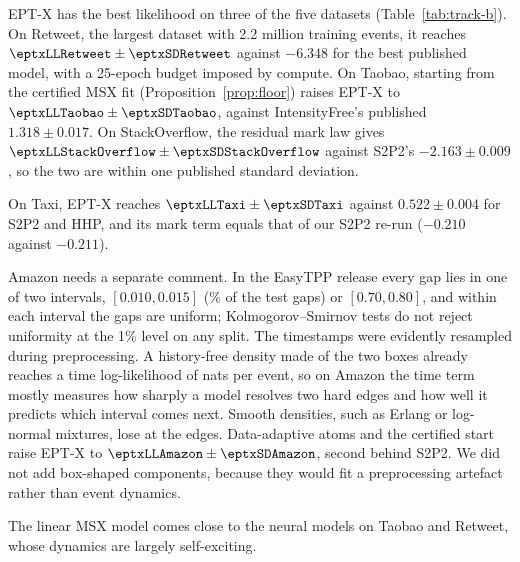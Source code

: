 EPT-X has the best likelihood on three of the five datasets (Table~\ref{tab:track-b}). On Retweet,
the largest dataset with 2.2 million training events, it reaches $\eptxLLRetweet\pm\eptxSDRetweet$
against $-6.348$ for the best published model, with a 25-epoch budget imposed by compute. On Taobao,
starting from the certified MSX fit (Proposition~\ref{prop:floor}) raises EPT-X to
$\eptxLLTaobao\pm\eptxSDTaobao$, against IntensityFree's published $1.318\pm0.017$. On
StackOverflow, the residual mark law gives $\eptxLLStackOverflow\pm\eptxSDStackOverflow$ against
S2P2's $-2.163\pm0.009$, so the two are within one published standard deviation.

On Taxi, EPT-X reaches $\eptxLLTaxi\pm\eptxSDTaxi$ against $0.522\pm0.004$ for S2P2 and HHP, and
its mark term equals that of our S2P2 re-run ($-0.210$ against $-0.211$).

Amazon needs a separate comment. In the EasyTPP release every gap lies in one of two intervals,
$[0.010,0.015]$ (\amzShortShare\% of the test gaps) or $[0.70,0.80]$, and within each interval the
gaps are uniform; Kolmogorov--Smirnov tests do not reject uniformity at the 1\% level on any split.
The timestamps were evidently resampled during preprocessing. A history-free density made of the
two boxes already reaches a time log-likelihood of \amzBoxLL{} nats per event, so on Amazon the
time term mostly measures how sharply a model resolves two hard edges and how well it predicts
which interval comes next. Smooth densities, such as Erlang or log-normal mixtures, lose at the
edges. Data-adaptive atoms and the certified start raise EPT-X to
$\eptxLLAmazon\pm\eptxSDAmazon$, second behind S2P2. We did not add box-shaped components, because
they would fit a preprocessing artefact rather than event dynamics.

The linear MSX model comes close to the neural models on Taobao and Retweet, whose dynamics are
largely self-exciting.

\begin{table}[!htbp]\centering\small
\caption{Track B, public benchmarks: test log-likelihood per event (higher is better).
Published numbers are from \citet{chang2025deep} and \citet{boyd2025hyper}; our rows give mean
$\pm$ s.d.\ over seeds (EPT-X: \eptxSeeds; other rows one seed), with the EPT-X
configuration selected per dataset on validation. Bold: best; underlined: second best;
shaded: our models.}
\label{tab:track-b}
\setlength{\tabcolsep}{5pt}

\end{table}

